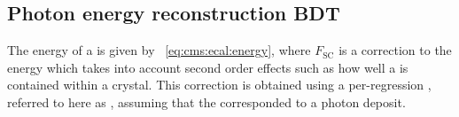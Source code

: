 


\subsection{Photon energy reconstruction BDT}
\label{sec:reco:photon:phoenergybdt}

The energy of a \SC is given by \Eq~\ref{eq:cms:ecal:energy}, %
where $F_{\text{SC}}$ is a correction to the \SC energy which takes into account second order effects such as how well a \SC is contained within a crystal. This correction is obtained using a per-\SC regression \BDT, referred to here as \PhoEnergyBdt, assuming that the \SC corresponded to a photon deposit. %

